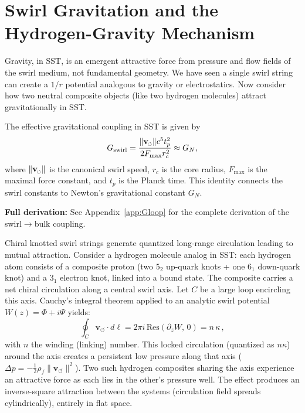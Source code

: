 \documentclass[10pt,reprint,aps,onecolumn,nofootinbib]{revtex4-2}
\newcommand{\vswirl}{\mathbf{v}_{\!\boldsymbol{\circlearrowleft}}}
\newcommand{\vnorm}{\lVert \mathbf{v}_{\mkern-2mu\scriptscriptstyle\boldsymbol{\circlearrowleft}} \rVert}               %
\begin{document}
    \section{Swirl Gravitation and the Hydrogen-Gravity Mechanism}
        Gravity, in SST, is an emergent attractive force from pressure and flow fields of the swirl medium, not fundamental geometry. We have seen a single swirl string can create a $1/r$ potential analogous to gravity or electrostatics. Now consider how two neutral composite objects (like two hydrogen molecules) attract gravitationally in SST.

        \begin{tcolorbox}[title=Swirl Gravitational Coupling $G_{\text{swirl}}$]
            The effective gravitational coupling in SST is given by
            \[
                G_{\text{swirl}} = \frac{\vnorm c^{5} t_p^{2}}{2 F_{\mathrm{max}} r_c^{2}} \approx G_N,
            \]
            where $\vnorm$ is the canonical swirl speed, $r_c$ is the core radius, $F_{\mathrm{max}}$ is the maximal force constant, and $t_p$ is the Planck time. This identity connects the swirl constants to Newton's gravitational constant $G_N$.

            \textbf{Full derivation:} See Appendix~\ref{app:Gloop} for the complete derivation of the swirl$\to$bulk coupling.
        \end{tcolorbox}

        \begin{tcolorbox}[title=Theorem 7.1: Hydrogen-Gravity Mechanism (Swirl Attraction in Flat Space)]
            Chiral knotted swirl strings generate quantized long-range circulation leading to mutual attraction. Consider a hydrogen molecule analog in SST: each hydrogen atom consists of a composite proton (two $5_2$ up-quark knots + one $6_1$ down-quark knot) and a $3_1$ electron knot, linked into a bound state. The composite carries a net chiral circulation along a central swirl axis. Let $C$ be a large loop encircling this axis. Cauchy’s integral theorem applied to an analytic swirl potential $W(z) = \Phi + i\Psi$ yields:
            \[
                \oint_C \vswirl \cdot d\ell = 2\pi i \,\text{Res}(\partial_z W,\,0) = n\,\kappa\,,
            \]
            with $n$ the winding (linking) number. This locked circulation (quantized as $n\kappa$) around the axis creates a persistent low pressure along that axis ($\Delta p = -\frac{1}{2}\rho_f \|\vswirl\|^2$). Two such hydrogen composites sharing the axis experience an attractive force as each lies in the other’s pressure well. The effect produces an inverse-square attraction between the systems (circulation field spreads cylindrically), entirely in flat space.
        \end{tcolorbox}
\end{document}
